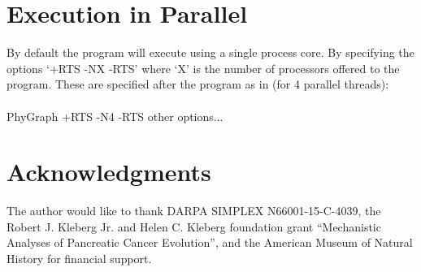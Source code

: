 \documentclass[11pt]{article}
\begin{document}
%	
%	
	
	\section{Execution in Parallel}
	By default the program will execute using a single process core.  By specifying the options `+RTS -NX -RTS' where `X' is the number of processors offered to the program. These are specified after the program as in (for 4 parallel threads):\\
	\\
	PhyGraph +RTS -N4 -RTS other options...  \\
	
	\section*{Acknowledgments}
	The author would like to thank DARPA SIMPLEX N66001-15-C-4039, the  Robert J. Kleberg Jr. and Helen C. Kleberg foundation grant ``Mechanistic Analyses of Pancreatic Cancer Evolution'', and the American Museum of Natural History for financial support.  
	
	\newpage
	
\end{document}
